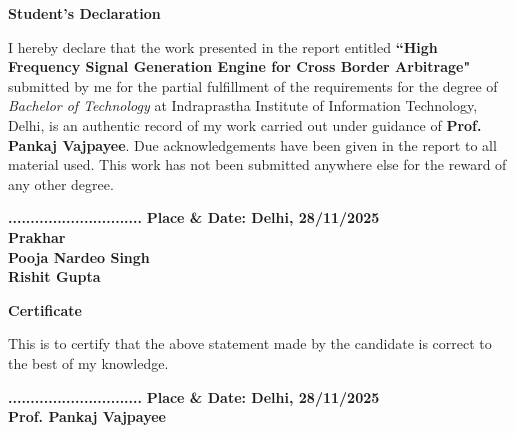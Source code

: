 \documentclass[letterpaper,11pt]{report}
\begin{document}


%

\newpage

\begin{center}
\textbf{\Large Student's Declaration}\label{section:declaration}
\end{center}
I hereby declare that the work presented in the report entitled \textbf{``High Frequency Signal Generation Engine for Cross Border Arbitrage"} submitted by me for the partial fulfillment of the requirements for the degree of \emph{Bachelor of Technology} at
 Indraprastha Institute of Information Technology, Delhi, is an authentic record of my work carried out under guidance of \textbf{Prof. Pankaj Vajpayee}. Due acknowledgements have  been given in the report to all material used. This work has not been submitted anywhere else for the reward of any other degree.
 \\ \vspace{0.5in}

\textbf{..............................}\hfill
\textbf{ Place \& Date: Delhi, 28/11/2025} \\
\textbf{Prakhar}\\
\textbf{Pooja Nardeo Singh}\\
\textbf{Rishit Gupta}




\vspace{3in}
\begin{center}
\textbf{\Large Certificate} \label{section:certificate}
\end{center}
This is to certify that the above statement made by the candidate is correct to the best of my knowledge.
 \\ \vspace{0.4in}

\textbf{..............................}\hfill
\textbf{ Place \& Date: Delhi, 28/11/2025} \\
\textbf{Prof. Pankaj Vajpayee}\\



\pagebreak
\end{document}

